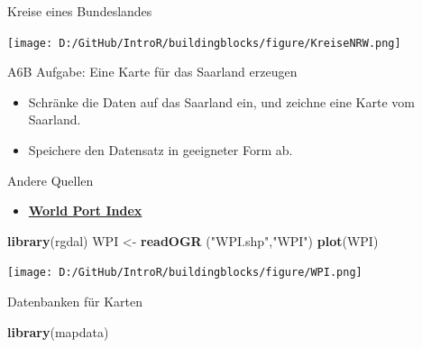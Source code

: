 \documentclass[ignorenonframetext,]{beamer}
\newenvironment{Shaded}{\begin{snugshade}}{\end{snugshade}}
\newcommand{\DecValTok}[1]{\textcolor[rgb]{0.00,0.00,0.81}{#1}}
\newcommand{\KeywordTok}[1]{\textcolor[rgb]{0.13,0.29,0.53}{\textbf{#1}}}
\newcommand{\NormalTok}[1]{#1}
\newcommand{\OperatorTok}[1]{\textcolor[rgb]{0.81,0.36,0.00}{\textbf{#1}}}
\newcommand{\StringTok}[1]{\textcolor[rgb]{0.31,0.60,0.02}{#1}}
\providecommand{\tightlist}{%
  \setlength{\itemsep}{0pt}\setlength{\parskip}{0pt}}
\begin{document}
\begin{frame}[fragile]{Kreise eines Bundeslandes}
\protect\hypertarget{kreise-eines-bundeslandes}{}

\begin{Shaded}
\end{Shaded}

\texttt{[image: D:/GitHub/IntroR/buildingblocks/figure/KreiseNRW.png]}

\end{frame}

\begin{frame}{A6B Aufgabe: Eine Karte für das Saarland erzeugen}
\protect\hypertarget{a6b-aufgabe-eine-karte-fur-das-saarland-erzeugen}{}

\begin{itemize}
\item
  Schränke die Daten auf das Saarland ein, und zeichne eine Karte vom
  Saarland.
\item
  Speichere den Datensatz in geeigneter Form ab.
\end{itemize}

\end{frame}

\begin{frame}[fragile]{Andere Quellen}
\protect\hypertarget{andere-quellen}{}

\begin{itemize}
\tightlist
\item
  \href{http://msi.nga.mil/NGAPortal/MSI.portal?_nfpb=true\&_pageLabel=msi_portal_page_62\&pubCode=0015}{\textbf{World
  Port Index}}
\end{itemize}

\begin{Shaded}
\begin{Highlighting}[]
\KeywordTok{library}\NormalTok{(rgdal)}
\NormalTok{WPI <-}\StringTok{ }\KeywordTok{readOGR}\NormalTok{ (}\StringTok{"WPI.shp"}\NormalTok{,}\StringTok{"WPI"}\NormalTok{)}
\KeywordTok{plot}\NormalTok{(WPI)}
\end{Highlighting}
\end{Shaded}

\texttt{[image: D:/GitHub/IntroR/buildingblocks/figure/WPI.png]}

Datenbanken für Karten

\begin{Shaded}
\begin{Highlighting}[]
\KeywordTok{library}\NormalTok{(mapdata)}
\end{Highlighting}
\end{Shaded}

\end{frame}
\end{document}

